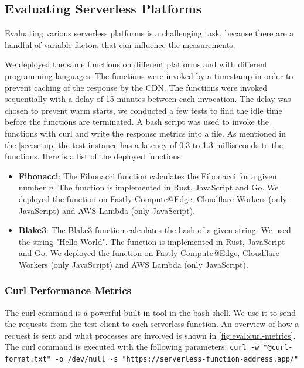 \subsection{Evaluating Serverless Platforms}
\label{subsec:evaluating-serverless-platforms}

Evaluating various serverless platforms is a challenging task, because there are a handful of variable factors that can influence the measurements.

We deployed the same functions on different platforms and with different programming languages. The functions were invoked by a timestamp in order to prevent caching of the response by the CDN. The functions were invoked sequentially with a delay of 15 minutes between each invocation. The delay was chosen to prevent warm starts, we conducted a few tests to find the idle time before the functions are terminated. A bash script was used to invoke the functions with curl and write the response metrics into a file. As mentioned in the \autoref{sec:setup} the test instance has a latency of 0.3 to 1.3 milliseconds to the functions. Here is a list of the deployed functions:

\begin{itemize}
    \item \textbf{Fibonacci}: The Fibonacci function calculates the Fibonacci for a given number \textit{n}. The function is implemented in Rust, JavaScript and Go. We deployed the function on Fastly Compute@Edge, Cloudflare Workers (only JavaScript) and AWS Lambda (only JavaScript).
    \item \textbf{Blake3}: The Blake3 function calculates the hash of a given string. We used the string "Hello World". The function is implemented in Rust, JavaScript and Go. We deployed the function on Fastly Compute@Edge, Cloudflare Workers (only JavaScript) and AWS Lambda (only JavaScript).
\end{itemize}

\subsubsection{Curl Performance Metrics}

The curl command is a powerful built-in tool in the bash shell. We use it to send the requests from the test client to each serverless function. An overview of how a request is sent and what processes are involved is shown in \autoref{fig:eval:curl-metrics}. The curl command is executed with the following parameters:
\texttt{curl -w "@curl-format.txt" -o /dev/null -s "https://serverless-function-address.app/"}

